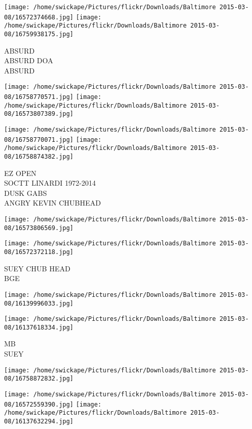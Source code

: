 \documentclass[10pt,letterpaper]{article}
\begin{document}
\vspace{0.25in}
\texttt{[image: /home/swickape/Pictures/flickr/Downloads/Baltimore 2015-03-08/16572374668.jpg]}
\texttt{[image: /home/swickape/Pictures/flickr/Downloads/Baltimore 2015-03-08/16759938175.jpg]}

ABSURD\\
ABSURD DOA\\
ABSURD
\pagebreak

\texttt{[image: /home/swickape/Pictures/flickr/Downloads/Baltimore 2015-03-08/16758770571.jpg]}
\texttt{[image: /home/swickape/Pictures/flickr/Downloads/Baltimore 2015-03-08/16573807389.jpg]}

\texttt{[image: /home/swickape/Pictures/flickr/Downloads/Baltimore 2015-03-08/16758770071.jpg]}
\texttt{[image: /home/swickape/Pictures/flickr/Downloads/Baltimore 2015-03-08/16758874382.jpg]}

EZ OPEN\\
SOCTT LINARDI 1972{-}2014\\
DUSK GABS\\
ANGRY KEVIN CHUBHEAD
\pagebreak

\texttt{[image: /home/swickape/Pictures/flickr/Downloads/Baltimore 2015-03-08/16573806569.jpg]}

\vspace{0.25in}
\texttt{[image: /home/swickape/Pictures/flickr/Downloads/Baltimore 2015-03-08/16572372118.jpg]}

SUEY CHUB HEAD\\
BGE
\pagebreak

\texttt{[image: /home/swickape/Pictures/flickr/Downloads/Baltimore 2015-03-08/16139996033.jpg]}

\vspace{0.25in}
\texttt{[image: /home/swickape/Pictures/flickr/Downloads/Baltimore 2015-03-08/16137618334.jpg]}

MB\\
SUEY
\pagebreak

\texttt{[image: /home/swickape/Pictures/flickr/Downloads/Baltimore 2015-03-08/16758872832.jpg]}

\vspace{0.25in}
\texttt{[image: /home/swickape/Pictures/flickr/Downloads/Baltimore 2015-03-08/16572559390.jpg]}
\texttt{[image: /home/swickape/Pictures/flickr/Downloads/Baltimore 2015-03-08/16137632294.jpg]}
\end{document}
